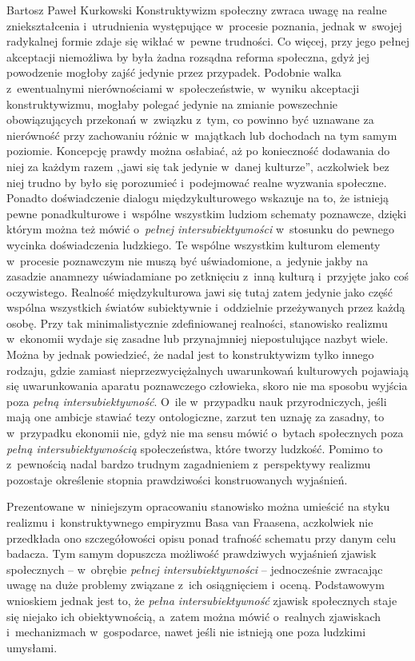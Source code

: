 \begin{artplenv}{Bartosz Paweł Kurkowski}
Konstruktywizm społeczny zwraca uwagę na realne zniekształcenia i~utrudnienia występujące w~procesie poznania,
jednak w~swojej radykalnej formie zdaje się wikłać w~pewne trudności. Co więcej, przy jego pełnej akceptacji niemożliwa by była
żadna rozsądna reforma społeczna, gdyż jej powodzenie mogłoby zajść jedynie przez przypadek. Podobnie
walka z~ewentualnymi nierównościami w~społeczeństwie, w~wyniku akceptacji konstruktywizmu, mogłaby polegać jedynie na zmianie
powszechnie obowiązujących przekonań w~związku z~tym, co powinno być uznawane za nierówność przy zachowaniu
różnic w~majątkach lub dochodach na tym samym poziomie.  Koncepcję prawdy można osłabiać, aż po konieczność dodawania do niej za
każdym razem ,,jawi się tak jedynie w~danej kulturze'', aczkolwiek bez niej trudno by było się porozumieć i~podejmować
realne wyzwania społeczne. Ponadto doświadczenie dialogu międzykulturowego wskazuje na to, że istnieją pewne
ponadkulturowe i~wspólne wszystkim ludziom schematy poznawcze, dzięki którym można też mówić o~\textit{pełnej
intersubiektywności} w~stosunku do pewnego wycinka doświadczenia ludzkiego. Te wspólne wszystkim kulturom
elementy w~procesie poznawczym nie muszą być uświadomione, a~jedynie jakby na zasadzie anamnezy uświadamiane po zetknięciu z~inną
kulturą i~przyjęte jako coś oczywistego. Realność międzykulturowa jawi się tutaj zatem jedynie jako część wspólna
wszystkich światów subiektywnie i~oddzielnie przeżywanych przez każdą osobę. Przy tak minimalistycznie zdefiniowanej
realności, stanowisko realizmu w~ekonomii wydaje się zasadne lub przynajmniej niepostulujące nazbyt wiele. Można by
jednak powiedzieć, że nadal jest to konstruktywizm tylko innego rodzaju, gdzie zamiast nieprzezwyciężalnych uwarunkowań
kulturowych pojawiają się uwarunkowania aparatu poznawczego człowieka, skoro nie ma sposobu wyjścia poza \textit{pełną
intersubiektywność}. O~ile w~przypadku nauk przyrodniczych, jeśli mają one ambicje stawiać tezy ontologiczne, zarzut
ten uznaję za zasadny, to w~przypadku ekonomii nie, gdyż nie ma sensu mówić o~bytach społecznych poza \textit{pełną
intersubiektywnością} społeczeństwa, które tworzy ludzkość. Pomimo to z~pewnością nadal bardzo trudnym
zagadnieniem z~perspektywy realizmu pozostaje określenie stopnia prawdziwości konstruowanych wyjaśnień.


Prezentowane w~niniejszym opracowaniu stanowisko można umieścić na styku realizmu i~konstruktywnego empiryzmu Basa van
Fraasena, aczkolwiek nie przedkłada ono szczegółowości opisu ponad trafność schematu przy danym celu badacza. Tym samym
dopuszcza możliwość prawdziwych wyjaśnień zjawisk społecznych -- w~obrębie
\textit{pełnej intersubiektywności} -- jednocześnie zwracając uwagę na duże problemy
związane z~ich osiągnięciem i~oceną. Podstawowym wnioskiem jednak jest
to, że \textit{pełna intersubiektywność }zjawisk społecznych staje się niejako ich obiektywnością, a~zatem można mówić
o~realnych zjawiskach i~mechanizmach w~gospodarce, nawet jeśli nie istnieją one poza ludzkimi umysłami.


\end{artplenv}
